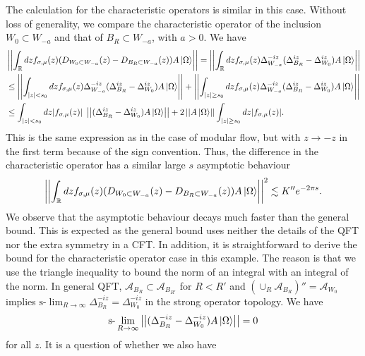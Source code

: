 \documentclass[a4paper,11pt]{article}
\theoremstyle{definition}
\begin{document}
The calculation for the characteristic operators is similar in this case. Without loss of generality, we compare the characteristic operator of the inclusion $W_0\subset W_{-a}$ and that of $B_R\subset W_{-a}$, with $a>0$. We have
{\small
\begin{align}
    &\left|\left|\int_\mathbb{R} dz f_{\sigma,\mu}(z)(D_{W_0\subset W_{-a}}(z) - D_{B_R\subset W_{-a}}(z))A\ket{\Omega}\right|\right| = \left|\left|\int_\mathbb{R} dz f_{\sigma,\mu}(z)\Delta_{W_{-a}}^{-iz}(\Delta_{B_R}^{iz} - \Delta_{W_0}^{iz})A\ket{\Omega}\right|\right| \\
    & \leq \left|\left|\int_{|z|<s_0} dz f_{\sigma,\mu}(z)\Delta_{W_{-a}}^{-iz}(\Delta_{B_R}^{iz} - \Delta_{W_0}^{iz})A\ket{\Omega}\right|\right| + \left|\left|\int_{|z|\geq s_0} dz f_{\sigma,\mu}(z)\Delta_{W_{-a}}^{-iz}(\Delta_{B_R}^{iz} - \Delta_{W_0}^{iz})A\ket{\Omega}\right|\right|\\
    &\leq \int_{|z|<s_0} dz |f_{\sigma,\mu}(z)|\;\left|\left|(\Delta_{B_R}^{iz} - \Delta_{W_0}^{iz})A\ket{\Omega}\right|\right| + 2 \left|\left|A\ket{\Omega}\right|\right|\int_{|z|\geq s_0} dz |f_{\sigma,\mu}(z)|.
\end{align}
}
This is the same expression as in the case of modular flow, but with $z\to-z$ in the first term because of the sign convention. Thus, the difference in the characteristic operator has a similar large $s$ asymptotic behaviour
\begin{align}
    \left|\left|\int_\mathbb{R} dz f_{\sigma,\mu}(z)(D_{W_0\subset W_{-a}}(z) - D_{B_R\subset W_{-a}}(z))A\ket{\Omega}\right|\right|^2 \lesssim K''e^{-2\pi s}.
\end{align}
We observe that the asymptotic behaviour decays much faster than the general bound. This is expected as the general bound uses neither the details of the QFT nor the extra symmetry in a CFT. In addition, it is straightforward to derive the bound for the characteristic operator case in this example. The reason is that we use the triangle inequality to bound the norm of an integral with an integral of the norm. In general QFT, $\mathcal{A}_{B_{R}} \subset \mathcal{A}_{B_{R'}}$ for $R<R'$ and $(\cup_R \mathcal{A}_{B_{R}})'' = \mathcal{A}_{W_0}$ implies $\text{s-}\lim_{R\to\infty} \Delta^{-iz}_{B_{R}} = \Delta^{-iz}_{W_0}$ in the strong operator topology. We have
\begin{align}
    \text{s-}\lim_{R\to \infty}\left|\left|(\Delta_{B_{R}}^{-iz} - \Delta_{W_0}^{-iz})A\ket{\Omega}\right|\right| = 0
\end{align}
for all $z$. It is a question of whether we also have
\end{document}
